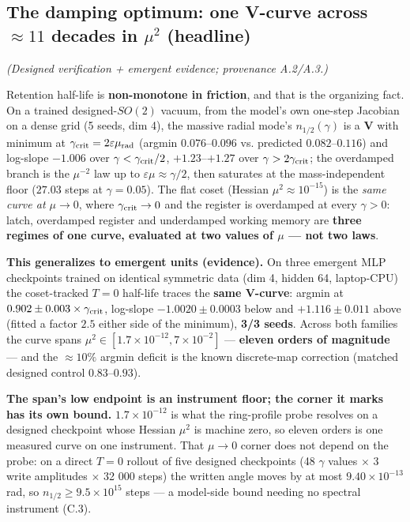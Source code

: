 \documentclass{article}
\begin{document}
\subsection{The damping optimum: one V-curve across $\approx11$ decades in $\mu^2$ (headline)}

\emph{(Designed verification + emergent evidence; provenance A.2/A.3.)}

Retention half-life is \textbf{non-monotone in friction}, and that is the organizing fact. On a trained designed-$SO(2)$ vacuum, from the model's own one-step Jacobian on a dense grid (5 seeds, dim 4), the massive radial mode's $n_{1/2}(\gamma)$ is a \textbf{V} with minimum at $\gamma_{\rm crit}=2\varepsilon\mu_{\rm rad}$ (argmin $0.076$--$0.096$ vs. predicted $0.082$--$0.116$) and log-slope $-1.006$ over $\gamma<\gamma_{\rm crit}/2$, $+1.23$--$+1.27$ over $\gamma>2\gamma_{\rm crit}$; the overdamped branch is the $\mu^{-2}$ law up to $\varepsilon\mu\approx\gamma/2$, then saturates at the mass-independent floor ($27.03$ steps at $\gamma=0.05$). The flat coset (Hessian $\mu^2\approx10^{-15}$) is the \emph{same curve at $\mu\to0$}, where $\gamma_{\rm crit}\to0$ and the register is overdamped at every $\gamma>0$: latch, overdamped register and underdamped working memory are \textbf{three regimes of one curve, evaluated at two values of $\mu$ --- not two laws}.

\textbf{This generalizes to emergent units (evidence).} On three emergent MLP checkpoints trained on identical symmetric data (dim 4, hidden 64, laptop-CPU) the coset-tracked $T=0$ half-life traces the \textbf{same V-curve}: argmin at $0.902\pm0.003\times\gamma_{\rm crit}$, log-slope $-1.0020\pm0.0003$ below and $+1.116\pm0.011$ above (fitted a factor $2.5$ either side of the minimum), \textbf{3/3 seeds}. Across both families the curve spans $\mu^2\in[1.7\times10^{-12},7\times10^{-2}]$ --- \textbf{eleven orders of magnitude} --- and the $\approx10\%$ argmin deficit is the known discrete-map correction (matched designed control $0.83$--$0.93$).

\textbf{The span's low endpoint is an instrument floor; the corner it marks has its own bound.} $1.7\times10^{-12}$ is what the ring-profile probe resolves on a designed checkpoint whose Hessian $\mu^2$ is machine zero, so eleven orders is one measured curve on one instrument. That $\mu\to0$ corner does not depend on the probe: on a direct $T=0$ rollout of five designed checkpoints (48 $\gamma$ values $\times$ 3 write amplitudes $\times$ 32 000 steps) the written angle moves by at most $9.40\times10^{-13}$ rad, so $n_{1/2}\ge9.5\times10^{15}$ steps --- a model-side bound needing no spectral instrument (C.3).
\end{document}

